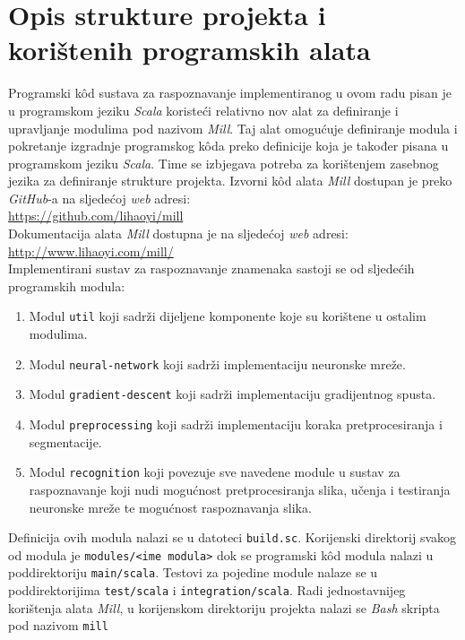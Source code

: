 \chapter{Opis strukture projekta i korištenih programskih alata}
\label{ch:opis-strukture-projekta-i-koristenih-programskih-alata}
Programski kôd sustava za raspoznavanje implementiranog u ovom radu pisan je u programskom jeziku \emph{Scala} koristeći
relativno nov alat za definiranje i upravljanje modulima pod nazivom \emph{Mill}. Taj alat omogućuje definiranje modula
i pokretanje izgradnje programskog kôda preko definicije koja je također pisana u programskom jeziku \emph{Scala}. Time
se izbjegava potreba za korištenjem zasebnog jezika za definiranje strukture projekta. Izvorni kôd alata \emph{Mill}
dostupan je preko \emph{GitHub}-a na sljedećoj \emph{web} adresi:\\
\url{https://github.com/lihaoyi/mill}\\
Dokumentacija alata \emph{Mill} dostupna je na sljedećoj \emph{web} adresi:\\
\url{http://www.lihaoyi.com/mill/}\\
Implementirani sustav za raspoznavanje znamenaka sastoji se od sljedećih programskih modula:
\begin{enumerate}
    \item Modul \texttt{util} koji sadrži dijeljene komponente koje su korištene u ostalim modulima.
    \item Modul \texttt{neural-network} koji sadrži implementaciju neuronske mreže.
    \item Modul \texttt{gradient-descent} koji sadrži implementaciju gradijentnog spusta.
    \item Modul \texttt{preprocessing} koji sadrži implementaciju koraka pretprocesiranja i segmentacije.
    \item Modul \texttt{recognition} koji povezuje sve navedene module u sustav za raspoznavanje koji nudi mogućnost
    pretprocesiranja slika, učenja i testiranja neuronske mreže te mogućnost raspoznavanja slika.
\end{enumerate}
Definicija ovih modula nalazi se u datoteci \texttt{build.sc}. Korijenski direktorij svakog od modula je
\texttt{modules/<ime modula>} dok se programski kôd modula nalazi u poddirektoriju \texttt{main/scala}. Testovi za
pojedine module nalaze se u poddirektorijima \texttt{test/scala} i \texttt{integration/scala}. Radi jednostavnijeg
korištenja alata \emph{Mill}, u korijenskom direktoriju projekta nalazi se \emph{Bash} skripta pod nazivom \texttt{mill}
